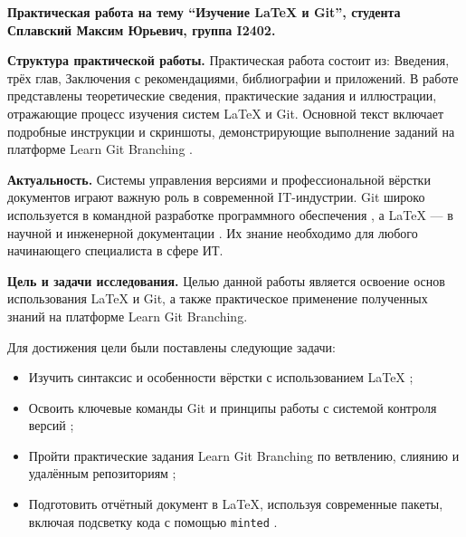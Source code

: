 \documentclass[a4paper,12pt]{report}
\newcommand{\uniGroupName}{I2402}
\newcommand{\authorNameRu}{Сплавский Максим Юрьевич}
\newcommand{\thesisTitleRu}{Изучение \LaTeX{} и Git}
\begin{document}


\clearpage
\tableofcontents %


\clearpage
{}

\textbf{Практическая работа на тему ``\thesisTitleRu{}'', студента \authorNameRu{}, группа \uniGroupName{}.}

\textbf{Структура практической работы.}
Практическая работа состоит из: Введения, трёх глав, Заключения с рекомендациями, библиографии и приложений. В работе представлены теоретические сведения, практические задания и иллюстрации, отражающие процесс изучения систем \LaTeX{} и Git. Основной текст включает подробные инструкции и скриншоты, демонстрирующие выполнение заданий на платформе Learn Git Branching \cite{learngitbranching}.

\textbf{Актуальность.}
Системы управления версиями и профессиональной вёрстки документов играют важную роль в современной IT-индустрии. Git широко используется в командной разработке программного обеспечения \cite{git_official_doc, progit_book}, а \LaTeX{} — в научной и инженерной документации \cite{latex_official_doc, latex_project_site, overleaf_intro}. Их знание необходимо для любого начинающего специалиста в сфере ИТ.

\textbf{Цель и задачи исследования.}
Целью данной работы является освоение основ использования \LaTeX{} и Git, а также практическое применение полученных знаний на платформе Learn Git Branching.

Для достижения цели были поставлены следующие задачи:
\begin{itemize}
  \item Изучить синтаксис и особенности вёрстки с использованием \LaTeX{} \cite{latex_official_doc, latex_project_site};
  \item Освоить ключевые команды Git и принципы работы с системой контроля версий \cite{progit_book};
  \item Пройти практические задания Learn Git Branching по ветвлению, слиянию и удалённым репозиториям \cite{learngitbranching};
  \item Подготовить отчётный документ в \LaTeX{}, используя современные пакеты, включая подсветку кода с помощью \texttt{minted} \cite{latex_minted}.
\end{itemize}
\end{document}
